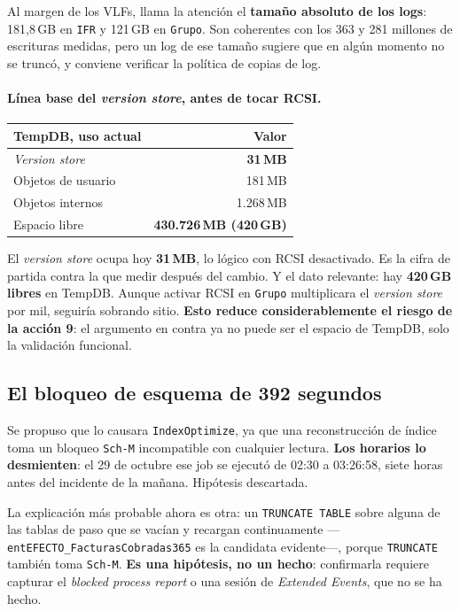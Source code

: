 \documentclass[11pt,a4paper]{article}
\newcommand{\cod}[1]{\texttt{\small #1}}
\newcommand{\bien}[1]{\textcolor{verde}{\textbf{#1}}}
\begin{document}
Al margen de los VLFs, llama la atención el \textbf{tamaño absoluto de los
logs}: 181,8\,GB en \cod{IFR} y 121\,GB en \cod{Grupo}. Son coherentes con
los 363 y 281 millones de escrituras medidas, pero un log de ese tamaño
sugiere que en algún momento no se truncó, y conviene verificar la política
de copias de log.

\paragraph{Línea base del \emph{version store}, antes de tocar RCSI.}

\begin{table}[h]
\centering
\small
\begin{tabular}{lr}
\toprule
\textbf{TempDB, uso actual} & \textbf{Valor} \\
\midrule
\emph{Version store}   & \bien{31\,MB} \\
Objetos de usuario     & 181\,MB \\
Objetos internos       & 1.268\,MB \\
Espacio libre          & \bien{430.726\,MB (420\,GB)} \\
\bottomrule
\end{tabular}
\end{table}

El \emph{version store} ocupa hoy \textbf{31\,MB}, lo lógico con RCSI
desactivado. Es la cifra de partida contra la que medir después del cambio. Y
el dato relevante: hay \textbf{420\,GB libres} en TempDB. Aunque activar RCSI
en \cod{Grupo} multiplicara el \emph{version store} por mil, seguiría
sobrando sitio. \textbf{Esto reduce considerablemente el riesgo de la acción
9}: el argumento en contra ya no puede ser el espacio de TempDB, solo la
validación funcional.

\subsection{El bloqueo de esquema de 392 segundos}
\label{sec:schm}

Se propuso que lo causara \cod{IndexOptimize}, ya que una reconstrucción de
índice toma un bloqueo \cod{Sch-M} incompatible con cualquier lectura.
\textbf{Los horarios lo desmienten}: el 29 de octubre ese job se ejecutó de
02:30 a 03:26:58, siete horas antes del incidente de la mañana. Hipótesis
descartada.

La explicación más probable ahora es otra: un \cod{TRUNCATE TABLE} sobre
alguna de las tablas de paso que se vacían y recargan continuamente
—\cod{entEFECTO\_FacturasCobradas365} es la candidata evidente—, porque
\cod{TRUNCATE} también toma \cod{Sch-M}. \textbf{Es una hipótesis, no un
hecho}: confirmarla requiere capturar el \emph{blocked process report} o una
sesión de \emph{Extended Events}, que no se ha hecho.
\end{document}
